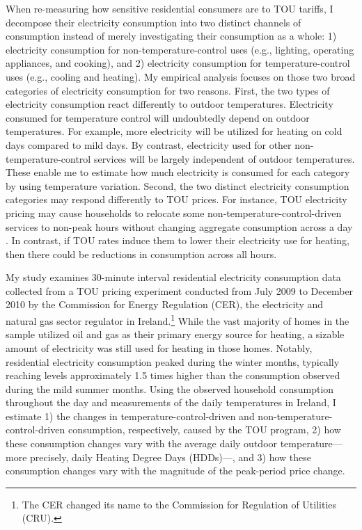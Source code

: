 When re-measuring how sensitive residential consumers are to TOU tariffs, I decompose their electricity consumption into two distinct channels of consumption instead of merely investigating their consumption as a whole: 1) electricity consumption for non-temperature-control uses (e.g., lighting, operating appliances, and cooking), and 2) electricity consumption for temperature-control uses (e.g., cooling and heating). My empirical analysis focuses on those two broad categories of electricity consumption for two reasons. First, the two types of electricity consumption react differently to outdoor temperatures. Electricity consumed for temperature control will undoubtedly depend on outdoor temperatures. For example, more electricity will be utilized for heating on cold days compared to mild days. By contrast, electricity used for other non-temperature-control services will be largely independent of outdoor temperatures. These enable me to estimate how much electricity is consumed for each category by using temperature variation. Second, the two distinct electricity consumption categories may respond differently to TOU prices. For instance, TOU electricity pricing may cause households to relocate some non-temperature-control-driven services to non-peak hours without changing aggregate consumption across a day \citep{Residential-Response-to-Critical-Peak-Pricing-of-Electricity_California-Evidence_Herter-and-Wayland_2010, Empowering-Consumers-through-Data-and-Smart-Technology_HML_2016}. In contrast, if TOU rates induce them to lower their electricity use for heating, then there could be reductions in consumption across all hours. 

My study examines 30-minute interval residential electricity consumption data collected from a TOU pricing experiment conducted from July 2009 to December 2010 by the Commission for Energy Regulation (CER), the electricity and natural gas sector regulator in Ireland.\footnote{The CER changed its name to the Commission for Regulation of Utilities (CRU).} While the vast majority of homes in the sample utilized oil and gas as their primary energy source for heating, a sizable amount of electricity was still used for heating in those homes. Notably, residential electricity consumption peaked during the winter months, typically reaching levels approximately 1.5 times higher than the consumption observed during the mild summer months. Using the observed household consumption throughout the day and measurements of the daily temperatures in Ireland, I estimate 1) the changes in temperature-control-driven and non-temperature-control-driven consumption, respectively, caused by the TOU program, 2) how these consumption changes vary with the average daily outdoor temperature---more precisely, daily Heating Degree Days (HDDs)---, and 3) how these consumption changes vary with the magnitude of the peak-period price change.  

